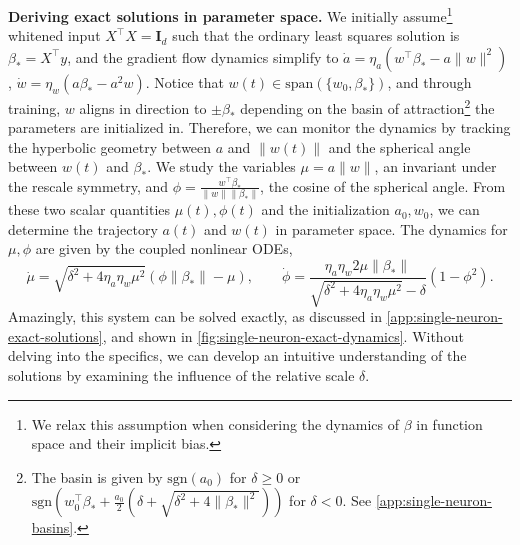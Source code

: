 \documentclass{article}
\theoremstyle{plain}
\theoremstyle{definition}
\theoremstyle{remark}
\begin{document}
\textbf{Deriving exact solutions in parameter space.}
%
We initially assume\footnote{We relax this assumption when considering the dynamics of $\beta$ in function space and their implicit bias.} whitened input $X^\intercal X = \mathbf{I}_d$ such that the ordinary least squares solution is $\beta_* = X^\intercal y$, and the gradient flow dynamics simplify to
$\dot{a} = \eta_a \left(w^\intercal \beta_* - a \|w\|^2\right)$, $\dot{w} = \eta_w \left(a\beta_* - a^2  w\right)$.
%
Notice that $w(t) \in \mathrm{span}(\{w_0, \beta_*\})$, and through training, $w$ aligns in direction to $\pm \beta_*$ depending on the basin of attraction\footnote{The basin is given by $\mathrm{sgn}(a_0)$ for $\delta \ge 0$ or $\mathrm{sgn}(w_0^\intercal \beta_* + \frac{a_0}{2} (\delta + \sqrt{\delta^2 + 4 \|\beta_*\|^2}))$ for $\delta < 0$. See \ref{app:single-neuron-basins}.} the parameters are initialized in.
%
Therefore, we can monitor the dynamics by tracking the hyperbolic geometry between $a$ and $\|w(t)\|$ and the spherical angle between $w(t)$ and $\beta_*$. 
%
We study the variables $\mu = a \|w\|$, an invariant under the rescale symmetry, and $\phi = \frac{w^\intercal \beta_*}{\|w\|\|\beta_*\|}$, the cosine of the spherical angle.
%
From these two scalar quantities $\mu(t), \phi(t)$ and the initialization $a_0, w_0$, we can determine the trajectory $a(t)$ and $w(t)$ in parameter space.
%
The dynamics for $\mu, \phi$ are given by the coupled nonlinear ODEs,
\begin{equation}
    \label{eq:single-neuron-transformed-dynamics}
    \dot{\mu} = \sqrt{\delta^2 + 4\eta_a\eta_w\mu^2}\left(\phi\|\beta_*\| - \mu\right),\qquad
    \dot{\phi} =  \frac{\eta_a\eta_w2\mu\|\beta_*\|}{\sqrt{\delta^2 + 4\eta_a\eta_w\mu^2} - \delta}\left(1 - \phi^2\right).
\end{equation}
Amazingly, this system can be solved exactly, as discussed in \cref{app:single-neuron-exact-solutions}, and shown in \cref{fig:single-neuron-exact-dynamics}.
%
Without delving into the specifics, we can develop an intuitive understanding of the solutions by examining the influence of the relative scale $\delta$.
\end{document}
